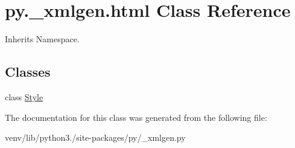 \hypertarget{classpy_1_1__xmlgen_1_1html}{}\section{py.\+\_\+xmlgen.\+html Class Reference}
\label{classpy_1_1__xmlgen_1_1html}


Inherits Namespace.

\subsection*{Classes}
\begin{DoxyCompactItemize}
\item 
class \hyperlink{classpy_1_1__xmlgen_1_1html_1_1_style}{Style}
\end{DoxyCompactItemize}


The documentation for this class was generated from the following file\+:\begin{DoxyCompactItemize}
\item 
venv/lib/python3./site-\/packages/py/\+\_\+xmlgen.\+py\end{DoxyCompactItemize}
